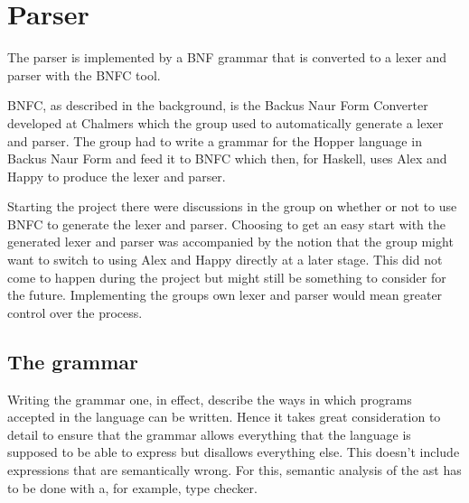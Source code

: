 \section{Parser}



The parser is implemented by a BNF grammar that is converted to a lexer and 
parser with the BNFC tool. 


BNFC, as described in the background, is the Backus Naur Form Converter developed at Chalmers which the group used to automatically generate a lexer and parser. The group had to write a grammar for the Hopper language in Backus Naur Form and feed it to BNFC which then, for Haskell, uses Alex and Happy to produce the lexer and parser.

Starting the project there were discussions in the group on whether or not to use BNFC to generate the lexer and parser. Choosing to get an easy start with the generated lexer and parser was accompanied by the notion that the group might want to switch to using Alex and Happy directly at a later stage. This did not come to happen during the project but might still be something to consider for the future. Implementing the groups own lexer and parser would mean greater control over the process.


\subsection{The grammar}

Writing the grammar one, in effect, describe the ways in which programs accepted in the language can be written. Hence it takes great consideration to detail to ensure that the grammar allows everything that the language is supposed to be able to express but disallows everything else. This doesn't include expressions that are semantically wrong. For this, semantic analysis of the \acrshort{ast} has to be done with a, for example, type checker. 

